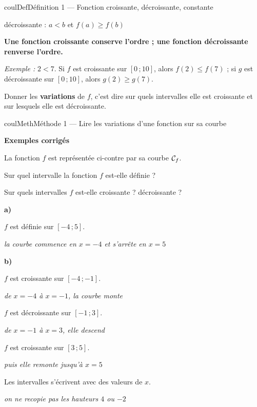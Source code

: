 \documentclass[11pt,a4paper]{article}
\makeatletter
\renewcommand{\le}{\leqslant}
\renewcommand{\ge}{\geqslant}
\newcommand{\lycee@repere}[4]{%
  \draw[grille,step=1] (#1,#2) grid (#3,#4);
  \draw[-{Stealth[length=2mm]},thick] (#1,0)--({#3+0.4},0) node[below left=-1pt]{$x$};
  \draw[-{Stealth[length=2mm]},thick] (0,#2)--(0,{#4+0.4}) node[below left=-1pt]{$y$};
  \node[below left,font=\scriptsize,inner sep=1.5pt] at (0,0) {$0$};}
\newcommand{\lycee@gradx}[1]{\foreach \k/\l in {#1}{%
  \draw (\k,0.07)--(\k,-0.07) node[below,font=\scriptsize,inner sep=1.5pt]{$\l$};}}
\newcommand{\lycee@grady}[1]{\foreach \k/\l in {#1}{%
  \draw (0.07,\k)--(-0.07,\k) node[left,font=\scriptsize,inner sep=1.5pt]{$\l$};}}
\newcommand{\lycee@intff}[2]{\left[#1\,;#2\right]}
\providecommand{\repere}{\lycee@repere}%
\providecommand{\gradx}{\lycee@gradx}%
\providecommand{\grady}{\lycee@grady}%
\providecommand{\Cf}{\mathcal{C}\sb{f}}%
\providecommand{\intff}{\lycee@intff}%
\newcounter{lycee@signet}
\newcommand{\signet}[3][]{\stepcounter{lycee@signet}%
  \edef\lycee@dest{\if\relax\detokenize{#1}\relax
    signet.\arabic{lycee@signet}\else#1\fi}%
  \hypertarget{\lycee@dest}{}\bookmark[level=#2,dest=\lycee@dest]{#3}}
\newcommand{\res}[1]{#1}
\newcounter{methode}
\newenvironment{definitionbox}[1][Définition]%
  {\begin{boitecours}[phantom={\signet{2}{#1}}]{coulDef}{#1}}{\end{boitecours}}
\newenvironment{methodebox}[1][Méthode]{\stepcounter{methode}%
  \begin{boitecours}[phantom={\signet[methode-\arabic{methode}]{2}{#1}}]{coulMeth}{#1}}%
  {\end{boitecours}}
\newcommand{\etape}[1]{\par\smallskip\textbf{\color{coulMeth}#1}\par\nobreak\smallskip}
\newcommand{\explique}[2]{\par\smallskip\noindent
  \begin{minipage}[t]{0.57\linewidth}\raggedright #1\end{minipage}\hfill
  \begin{minipage}[t]{0.40\linewidth}\raggedright\leavevmode
    {\small\itshape\color{black!60}#2}\end{minipage}\par}
\newcommand{\cas}[1]{\par\smallskip\noindent\textbf{\color{coulExo}#1}\vadjust{\nobreak}}
\newenvironment{correction}{\par}{\par}
\newcommand{\etapeexemples}{\etape{Exemples corrigés}}
\makeatother
\begin{document}
\begin{definitionbox}[Définition 1 --- Fonction croissante, décroissante, constante]
\begin{minipage}{0.48\linewidth}
{\small décroissante : $a<b$ et $f(a)\ge f(b)$}
\end{minipage}

\smallskip
\textbf{Une fonction croissante conserve l'ordre ; une fonction décroissante
renverse l'ordre.}

\textit{Exemple :} $2<7$. Si $f$ est croissante sur $\intff{0}{10}$, alors
$f(2)\le f(7)$ ; si $g$ est décroissante sur $\intff{0}{10}$, alors $g(2)\ge g(7)$.

\smallskip
Donner les \textbf{variations} de $f$, c'est dire sur quels intervalles elle est
croissante et sur lesquels elle est décroissante.
\end{definitionbox}

\begin{methodebox}[Méthode 1 --- Lire les variations d'une fonction sur sa courbe]
\etapeexemples
\begin{minipage}[c]{0.58\linewidth}\raggedright
La fonction $f$ est représentée ci-contre par sa courbe $\Cf$.
\begin{questions}[label=\alph*)]
  \item Sur quel intervalle la fonction $f$ est-elle définie ?
  \item Sur quels intervalles $f$ est-elle croissante ? décroissante ?
\end{questions}
\end{minipage}\hfill
\begin{minipage}[c]{0.38\linewidth}\centering
{}
\end{minipage}
\begin{correction}
\cas{a)}
\explique{$f$ est définie sur \res{$\intff{-4}{5}$}.}{la courbe commence en $x=-4$ et
s'arrête en $x=5$}
\cas{b)}
\explique{\res{$f$ est croissante sur $\intff{-4}{-1}$}.}{de $x=-4$ à $x=-1$, la courbe monte}
\explique{\res{$f$ est décroissante sur $\intff{-1}{3}$}.}{de $x=-1$ à $x=3$, elle descend}
\explique{\res{$f$ est croissante sur $\intff{3}{5}$}.}{puis elle remonte jusqu'à $x=5$}
\explique{Les intervalles s'écrivent avec des valeurs de $x$.}{on ne recopie pas les
hauteurs $4$ ou $-2$}
\end{correction}


\end{methodebox}
\end{document}
